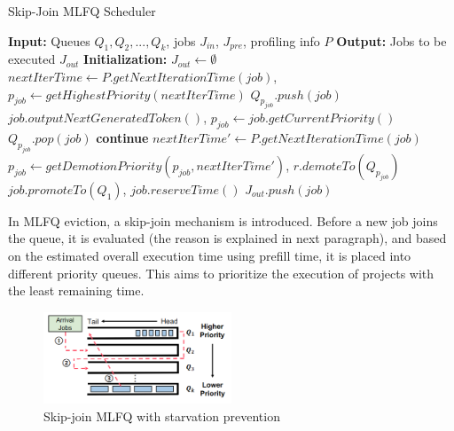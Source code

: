 \documentclass[conference]{IEEEtran}
\begin{document}
\begin{algorithm}
    \caption{Skip-Join MLFQ Scheduler}
    \begin{algorithmic}[1]
        \State \textbf{Input:} Queues $Q_1, Q_2, ..., Q_k$, jobs $J_{in}$, $J_{pre}$, profiling info $P$
        \State \textbf{Output:} Jobs to be executed $J_{out}$
        \State \textbf{Initialization:} $J_{out} \leftarrow \emptyset$
        \State $nextIterTime \leftarrow P.getNextIterationTime(job)$, $p_{job} \leftarrow getHighestPriority(nextIterTime)$
        \State $Q_{p_{job}}.push(job)$
        \EndFor
        \State $job.outputNextGeneratedToken()$, $p_{job} \leftarrow job.getCurrentPriority()$
        \State $Q_{p_{job}}.pop(job)$
        \State \textbf{continue}
        \EndIf
        \State $nextIterTime' \leftarrow P.getNextIterationTime(job)$
        \State $p_{job} \leftarrow getDemotionPriority(p_{job}, nextIterTime')$, $r.demoteTo(Q_{p_{job}})$
        \EndIf
        \EndFor
        \State $job.promoteTo(Q_1)$, $job.reserveTime()$
        \EndIf
        \EndFor
        \EndFor
        \State $J_{out}.push(job)$
        \EndIf
        \EndFor
        \EndFor
        \EndProcedure
    \end{algorithmic}
\end{algorithm}
In MLFQ eviction, a skip-join mechanism is introduced. Before a new job joins the queue, it is evaluated (the reason is explained in next paragraph), and based on the estimated overall execution time using prefill time, it is placed into different priority queues. This aims to prioritize the execution of projects with the least remaining time.

\begin{figure}[htbp]
    \centerline{\includegraphics[width=0.5\textwidth]{process fig4.png}}
    \caption{Skip-join MLFQ with starvation prevention}
    \label{fig}
\end{figure}
\end{document}
